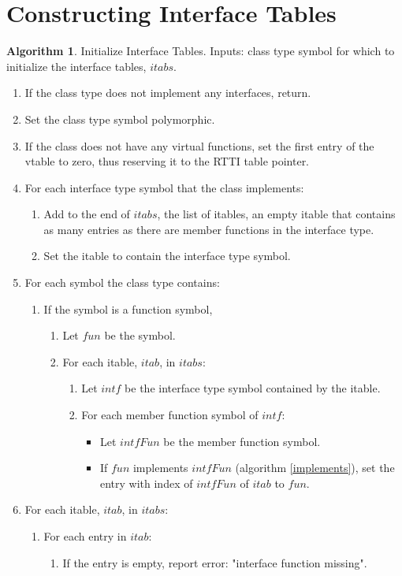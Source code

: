 \documentclass[a4paper,oneside,11pt]{book}
\theoremstyle{definition}
\newtheorem{algo}{Algorithm}[section]
\begin{document}
\section{Constructing Interface Tables}

\begin{algo}\label{inititbls} Initialize Interface Tables. Inputs: class type symbol for which to initialize the interface tables, $itabs$.
\begin{enumerate}
\item
If the class type does not implement any interfaces, return.
\item
Set the class type symbol polymorphic.
\item
If the class does not have any virtual functions, set the first entry of the vtable to zero, thus reserving it to the RTTI table pointer.
\item
For each interface type symbol that the class implements:
\begin{enumerate}
\item
Add to the end of $itabs$, the list of itables, an empty itable that contains as many entries as there are member functions in the interface type.
\item
Set the itable to contain the interface type symbol.
\end{enumerate}
\item
For each symbol the class type contains:
\begin{enumerate}
\item
If the symbol is a function symbol,
\begin{enumerate}
\item
Let $fun$ be the symbol.
\item
For each itable, $itab$, in $itabs$:
\begin{enumerate}
\item
Let $intf$ be the interface type symbol contained by the itable.
\item
For each member function symbol of $intf$:
\begin{itemize}
\item
Let $intfFun$ be the member function symbol.
\item
If $fun$ implements $intfFun$ (algorithm \ref{implements}), set the entry with index of $intfFun$ of $itab$ to $fun$.
\end{itemize}
\end{enumerate}
\end{enumerate}
\end{enumerate}
\item
For each itable, $itab$, in $itabs$:
\begin{enumerate}
\item
For each entry in $itab$:
\begin{enumerate}
\item
If the entry is empty, report error: "interface function missing".
\end{enumerate}
\end{enumerate}
\end{enumerate}
\end{algo}
\end{document}
